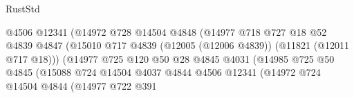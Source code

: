 \begin{lexlean}{RustStd}
\begin{coremodule}
                                                @4506
                                                @12341
                                                (@14972
                                                  @728
                                                  @14504
                                                  @4848
                                                  (@14977
                                                    @718
                                                    @727
                                                    @18
                                                    @52
                                                    @4839
                                                    @4847
                                                    (@15010
                                                      @717
                                                      @4839
                                                      (@12005 (@12006 @4839))
                                                      (@11821 (@12011 @717 @18)))
                                                    (@14977
                                                      @725
                                                      @120
                                                      @50
                                                      @28
                                                      @4845
                                                      @4031
                                                      (@14985
                                                        @725
                                                        @50
                                                        @4845
                                                        (@15088
                                                          @724
                                                          @14504
                                                          @4037
                                                          @4844
                                                          @4506
                                                          @12341
                                                          (@14972
                                                            @724
                                                            @14504
                                                            @4844
                                                            (@14977
                                                              @722
                                                              @391

\end{coremodule}
\end{lexlean}
